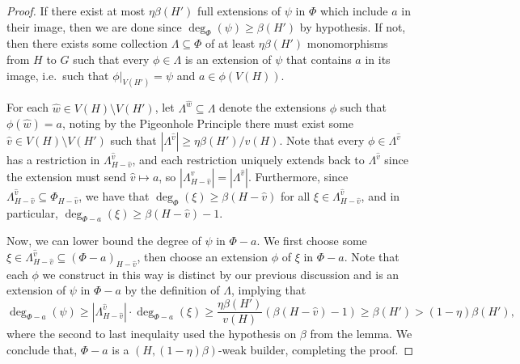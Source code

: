 \documentclass[12pt,letterpaper]{article}
\theoremstyle{definition}
\newcommand{\sub}{\subseteq}
\begin{document}
\begin{proof}
		If there exist at most $\eta \beta(H')$ full extensions of $\psi$ in $\Phi$ which include $a$ in their image, then we are done since $\deg_\Phi(\psi)\ge \beta(H')$ by hypothesis. If not, then there exists some collection $\Lambda\subseteq \Phi$ of at least $\eta \beta(H')$ monomorphisms from $H$ to $G$ such that every $\phi\in \Lambda$ is an extension of $\psi$ that contains $a$ in its image, i.e.\ such that $\phi|_{V(H')}=\psi$ and $a\in \phi(V(H))$.
		
		For each $\hat{w}\in V(H)\setminus V(H')$, let $\Lambda^{\hat{w}}\subseteq \Lambda$ denote the extensions $\phi$ such that $\phi(\hat{w})=a$, noting by the Pigeonhole Principle there must exist some $\hat{v}\in V(H)\setminus V(H')$ such that $|\Lambda^{\hat{v}}|\geq \eta \beta(H')/v(H)$. Note that every $\phi\in\Lambda^{\hat{v}}$ has a restriction in $\Lambda^{\hat{v}}_{H-\hat{v}}$, and each restriction uniquely extends back to $\Lambda^{\hat{v}}$ since the extension must send $\hat{v}\mapsto a$, so $|\Lambda^{\hat{v}}_{H-\hat{v}}|=|\Lambda^{\hat{v}}|$. Furthermore, since $\Lambda^{\hat{v}}_{H-\hat{v}}\subseteq \Phi_{H-\hat{v}}$, we have that $\deg_{\Phi}(\xi)\geq \beta(H-\hat{v})$ for all $\xi\in \Lambda^{\hat{v}}_{H-\hat{v}}$, and in particular, $\deg_{\Phi-a}(\xi)\geq \beta(H-\hat{v})-1$.
		
		Now, we can lower bound the degree of $\psi$ in $\Phi-a$. We first choose some $\xi\in \Lambda^{\hat{v}}_{H-\hat{v}}\sub (\Phi-a)_{H-\hat{v}}$, then choose an extension $\phi$ of $\xi$ in $\Phi-a$. Note that each $\phi$ we construct in this way is distinct by our previous discussion and is an extension of $\psi$ in $\Phi-a$ by the definition of $\Lambda$, implying that 
		\[
		\deg_{\Phi-a}(\psi)\geq |\Lambda^{\hat{v}}_{H-\hat{v}}|\cdot \deg_{\Phi-a}(\xi)\geq \frac{\eta \beta(H')}{v(H)}(\beta(H-\hat{v})-1)\geq \beta(H')>(1-\eta)\beta(H'),
		\]
		where the second to last inequlaity used the hypothesis on $\beta$ from the lemma.
		We conclude that, $\Phi-a$ is a $(H,(1-\eta)\beta)$-weak builder, completing the proof.
	\end{proof}
	
\end{document}
